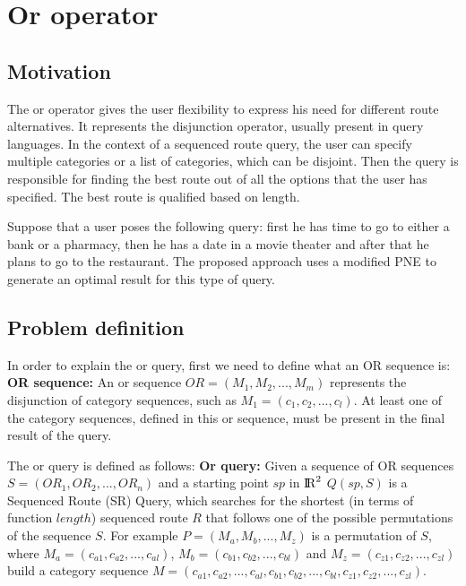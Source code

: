 

\section{Or operator}

\subsection{Motivation}
\label{sec:motOR}
The or operator gives the user flexibility to express his need for different route alternatives. It represents the disjunction operator, usually present in query languages. In the context of a sequenced route query, the user can specify multiple categories or a list of categories, which can be disjoint. Then the query is responsible for finding the best route out of all the options that the user has specified. The best route is qualified based on length.

Suppose that a user poses the following query: first he has time to go to either a bank or a pharmacy, then he has a date in a movie theater and after that he plans to go to the restaurant. The proposed approach uses a modified PNE to generate an optimal result for this type of query.

\subsection{Problem definition} 
\label{sec:problemOr}
In order to explain the or query, first we need to define what an OR sequence is: \newline
\textbf{OR sequence:} An or sequence $OR = (M_1, M_2, ..., M_m)$ represents the disjunction of category sequences, such as $M_1 = (c_1, c_2, ..., c_l)$. At least one of the category sequences, defined in this or sequence, must be present in the final result of the query.

The or query is defined as follows: \newline
\textbf{Or query:} Given a sequence of OR sequences $S = (OR_1, OR_2, ..., OR_n)$ and a starting point $sp$ in ${\rm I\!R}^2$
$Q(sp, S)$ is a Sequenced Route (SR) Query, which searches for the shortest (in terms of function $length$) sequenced route $R$ that follows one of the possible permutations of the sequence $S$. 
For example $P = (M_a, M_b, ..., M_z)$ is a permutation of $S$, where $M_a = (c_{a1}, c_{a2}, ..., c_{al})$, $M_b = (c_{b1}, c_{b2}, ..., c_{bl})$ and $M_z = (c_{z1}, c_{z2}, ..., c_{zl})$ build a category sequence \newline
$M = (c_{a1}, c_{a2}, ..., c_{al}, c_{b1}, c_{b2}, ..., c_{bl}, c_{z1}, c_{z2}, ..., c_{zl})$.

